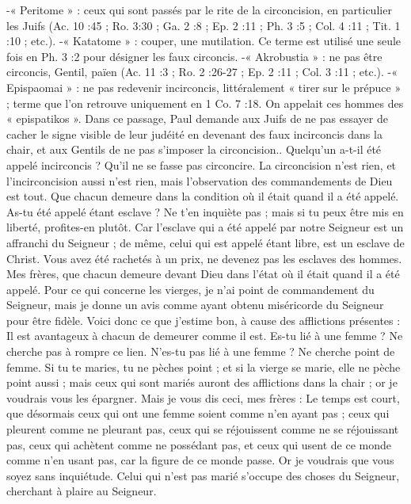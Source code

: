 \begin{multicols}{2}
{-« Peritome » : ceux qui sont passés par le rite de la circoncision, en particulier les Juifs (Ac. 10 :45 ; Ro. 3:30 ; Ga. 2 :8 ; Ep. 2 :11 ; Ph. 3 :5 ; Col. 4 :11 ; Tit. 1 :10 ; etc.).
-« Katatome » : couper, une mutilation. Ce terme est utilisé une seule fois en Ph. 3 :2 pour désigner les faux circoncis. 
-« Akrobustia » : ne pas être circoncis, Gentil, païen (Ac. 11 :3 ; Ro. 2 :26-27 ; Ep. 2 :11 ; Col. 3 :11 ; etc.). 
-« Epispaomai » : ne pas redevenir incirconcis, littéralement « tirer sur le prépuce » ; terme que l’on retrouve uniquement en 1 Co. 7 :18. On appelait ces hommes des « epispatikos ». Dans ce passage, Paul demande aux Juifs de ne pas essayer de cacher le signe visible de leur judéité en devenant des faux incirconcis dans la chair, et aux Gentils de ne pas s’imposer la circoncision.}. Quelqu'un a-t-il été appelé incirconcis ? Qu'il ne se fasse pas circoncire.
La circoncision n'est rien, et l'incirconcision aussi n'est rien, mais l'observation des commandements de Dieu est tout.
Que chacun demeure dans la condition où il était quand il a été appelé.
As-tu été appelé étant esclave ? Ne t'en inquiète pas ; mais si tu peux être mis en liberté, profites-en plutôt.
Car l'esclave qui a été appelé par notre Seigneur est un affranchi du Seigneur ; de même, celui qui est appelé étant libre, est un esclave de Christ.
Vous avez été rachetés à un prix, ne devenez pas les esclaves des hommes.
Mes frères, que chacun demeure devant Dieu dans l'état où il était quand il a été appelé.
Pour ce qui concerne les vierges, je n'ai point de commandement du Seigneur, mais je donne un avis comme ayant obtenu miséricorde du Seigneur pour être fidèle.
Voici donc ce que j'estime bon, à cause des afflictions présentes : Il est avantageux à chacun de demeurer comme il est.
Es-tu lié à une femme ? Ne cherche pas à rompre ce lien. N'es-tu pas lié à une femme ? Ne cherche point de femme.
Si tu te maries, tu ne pèches point ; et si la vierge se marie, elle ne pèche point aussi ; mais ceux qui sont mariés auront des afflictions dans la chair ; or je voudrais vous les épargner.
Mais je vous dis ceci, mes frères : Le temps est court, que désormais ceux qui ont une femme soient comme n'en ayant pas ;
ceux qui pleurent comme ne pleurant pas, ceux qui se réjouissent comme ne se réjouissant pas, ceux qui achètent comme ne possédant pas,
et ceux qui usent de ce monde comme n'en usant pas, car la figure de ce monde passe.
Or je voudrais que vous soyez sans inquiétude. Celui qui n'est pas marié s'occupe des choses du Seigneur, cherchant à plaire au Seigneur.

\end{multicols}

